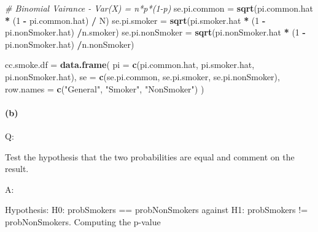 \documentclass[
]{article}
\newenvironment{Shaded}{\begin{snugshade}}{\end{snugshade}}
\newcommand{\CommentTok}[1]{\textcolor[rgb]{0.56,0.35,0.01}{\textit{#1}}}
\newcommand{\DataTypeTok}[1]{\textcolor[rgb]{0.13,0.29,0.53}{#1}}
\newcommand{\DecValTok}[1]{\textcolor[rgb]{0.00,0.00,0.81}{#1}}
\newcommand{\KeywordTok}[1]{\textcolor[rgb]{0.13,0.29,0.53}{\textbf{#1}}}
\newcommand{\NormalTok}[1]{#1}
\newcommand{\OperatorTok}[1]{\textcolor[rgb]{0.81,0.36,0.00}{\textbf{#1}}}
\newcommand{\StringTok}[1]{\textcolor[rgb]{0.31,0.60,0.02}{#1}}
\begin{document}
\begin{Shaded}
\begin{Highlighting}[]
\CommentTok{# Binomial Vairance - Var(X) = n*p*(1-p)}
\NormalTok{se.pi.common =}\StringTok{ }\KeywordTok{sqrt}\NormalTok{(pi.common.hat }\OperatorTok{*}\StringTok{ }\NormalTok{(}\DecValTok{1} \OperatorTok{-}\StringTok{ }\NormalTok{pi.common.hat) }\OperatorTok{/}\StringTok{ }\NormalTok{N)}
\NormalTok{se.pi.smoker =}\StringTok{ }\KeywordTok{sqrt}\NormalTok{(pi.smoker.hat }\OperatorTok{*}\StringTok{ }\NormalTok{(}\DecValTok{1} \OperatorTok{-}\StringTok{ }\NormalTok{pi.nonSmoker.hat) }\OperatorTok{/}\NormalTok{n.smoker)}
\NormalTok{se.pi.nonSmoker =}\StringTok{ }\KeywordTok{sqrt}\NormalTok{(pi.nonSmoker.hat }\OperatorTok{*}\StringTok{ }\NormalTok{(}\DecValTok{1} \OperatorTok{-}\StringTok{ }\NormalTok{pi.nonSmoker.hat) }\OperatorTok{/}\NormalTok{n.nonSmoker)}

\NormalTok{cc.smoke.df  =}\StringTok{ }\KeywordTok{data.frame}\NormalTok{( }
  \DataTypeTok{pi =} \KeywordTok{c}\NormalTok{(pi.common.hat, pi.smoker.hat, pi.nonSmoker.hat), }
  \DataTypeTok{se =} \KeywordTok{c}\NormalTok{(se.pi.common, se.pi.smoker, se.pi.nonSmoker),}
  \DataTypeTok{row.names =} \KeywordTok{c}\NormalTok{(}\StringTok{"General"}\NormalTok{, }\StringTok{"Smoker"}\NormalTok{, }\StringTok{"NonSmoker"}\NormalTok{)}
\NormalTok{  )}
\end{Highlighting}
\end{Shaded}

\hypertarget{b-1}{%
\paragraph{(b)}\label{b-1}}

Q:

Test the hypothesis that the two probabilities are equal and comment on
the result.

A:

Hypothesis: H0: probSmokers == probNonSmokers against H1: probSmokers !=
probNonSmokers. Computing the p-value
\end{document}
